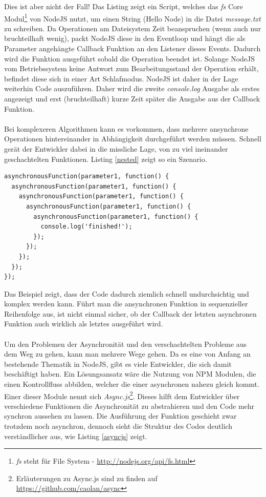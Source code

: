 Dies ist aber nicht der Fall! Das Listing zeigt ein Script, welches das \textit{fs} Core Modul\footnote{\textit{fs} steht für File System - \url{http://nodejs.org/api/fs.html}} von NodeJS nutzt, um einen String (\glqq Hello Node\grqq{}) in die Datei \textit{message.txt} zu schreiben. Da Operationen am Dateisystem Zeit beanspruchen (wenn auch nur bruchteilhaft wenig), packt NodeJS diese in den Eventloop und hängt die als Parameter angehängte Callback Funktion an den Listener dieses Events. Dadurch wird die Funktion ausgeführt sobald die Operation beendet ist. Solange NodeJS vom Betriebssystem keine Antwort zum Bearbeitungsstand der Operation erhält, befindet diese sich in einer Art Schlafmodus. NodeJS ist daher in der Lage weiterhin Code auszuführen. Daher wird die zweite \textit{console.log} Ausgabe als erstes angezeigt und erst (bruchteilhaft) kurze Zeit später die Ausgabe aus der Callback Funktion.\\
\\
Bei komplexeren Algorithmen kann es vorkommen, dass mehrere ansynchrone Operationen hintereinander in Abhängigkeit durchgeführt werden müssen. Schnell gerät der Entwickler dabei in die missliche Lage, von zu viel ineinander geschachtelten Funktionen. Listing \ref{nested} zeigt so ein Szenario.

\vspace{0.6cm}
\begin{lstlisting}[caption=\glqq Pyramid of Doom\grqq{} - Undurchsichtiger und unsauberer Code durch zu viele verschachtelte Funktionen,label=nested]
asynchronousFunction(parameter1, function() {
  asynchronousFunction(parameter1, function() {
    asynchronousFunction(parameter1, function() {
      asynchronousFunction(parameter1, function() {
        asynchronousFunction(parameter1, function() {
          console.log('finished!');
        });
      });
    });
  });
});
\end{lstlisting}

Das Beispiel zeigt, dass der Code dadurch ziemlich schnell undurchsichtig und komplex werden kann. Führt man die ansynchronen Funktion in sequenzieller Reihenfolge aus, ist nicht einmal sicher, ob der Callback der letzten asynchronen Funktion auch wirklich als letztes ausgeführt wird.\\
\\
Um den Problemen der Asynchronität und den verschachtelten Probleme aus dem Weg zu gehen, kann man mehrere Wege gehen. Da es eine von Anfang an bestehende Thematik in NodeJS, gibt es viele Entwickler, die sich damit beschäftigt haben. Ein Lösungsansatz wäre die Nutzung von NPM Modulen, die einen Kontrollfluss abbilden, welcher die einer asynchronen nahezu gleich kommt. Einer dieser Module nennt sich \textit{Async.js}\footnote{Erläuterungen zu Async.js sind zu finden auf \url{https://github.com/caolan/async}}. Dieses hilft dem Entwickler über verschiedene Funktionen die Asynchronität zu abstrahieren und den Code mehr synchron aussehen zu lassen. Die Ausführung der Funktion geschieht zwar trotzdem noch asynchron, dennoch sieht die Struktur des Codes deutlich verständlicher aus, wie Listing \ref{asyncjs} zeigt.

